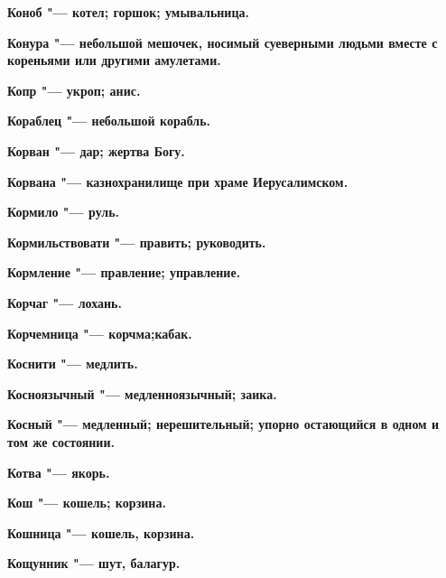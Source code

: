 \begin{mymulticols}{2}
\bfseries Коноб\normalfont{} "--- котел; горшок; умывальница. 




\bfseries Конура\normalfont{} "--- небольшой мешочек, носимый суеверными людьми вместе с кореньями или другими амулетами. 




\bfseries Копр\normalfont{} "--- укроп; анис. 




\bfseries Кораблец\normalfont{} "--- небольшой корабль. 




\bfseries Корван\normalfont{} "--- дар; жертва Богу. 




\bfseries Корвана\normalfont{} "--- казнохранилище при храме Иерусалимском. 




\bfseries Кормило\normalfont{} "--- руль. 




\bfseries Кормильствовати\normalfont{} "--- править; руководить. 




\bfseries Кормление\normalfont{} "--- правление; управление. 




\bfseries Корчаг\normalfont{} "--- лохань. 




\bfseries Корчемница\normalfont{} "--- корчма;кабак. 




\bfseries Коснити\normalfont{} "--- медлить. 




\bfseries Косноязычный\normalfont{} "--- медленноязычный; заика. 




\bfseries Косный\normalfont{} "--- медленный; нерешительный; упорно остающийся в одном и том же состоянии. 




\bfseries Котва\normalfont{} "--- якорь. 




\bfseries Кош\normalfont{} "--- кошель; корзина. 




\bfseries Кошница\normalfont{} "--- кошель, корзина. 




\bfseries Кощунник\normalfont{} "--- шут, балагур. 





\end{mymulticols}
